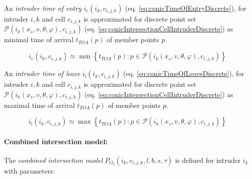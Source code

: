 \noindent An \emph{intruder time of entry} $i_e(i_k,c_{i,j,k})$ (eq. \ref{eq:conicTimeOfEntryDiscrete}), for intruder $i,k$ and cell $c_{i,j,k}$ is approximated for discrete point set  $\mathscr{P}(i_k({x}_s,{v},\theta,\varphi),c_{i,j,k})$ (eq. \ref{eq:conicIntersectionCellIntruderDiscrete}) as minimal time of arrival $t_{TOA}({p})$ of member points ${p}$.

\begin{equation}\label{eq:conicTimeOfEntryDiscrete}
    i_e(i_k,c_{i,j,k})\approx \min \left\{t_{TOA}({p}):{p}\in\mathscr{P}(i_k({x}_s,{v},\theta,\varphi),c_{i,j,k})\right\}
\end{equation}

\noindent An \emph{intruder time of leave} $i_l(i_k,c_{i,j,k})$ (eq. \ref{eq:conicTimeOfLeaveDiscrete}), for intruder $i,k$ and cell $c_{i,j,k}$ is approximated for discrete point set  $\mathscr{P}(i_k({x}_s,{v},\theta,\varphi),c_{i,j,k})$ (eq. \ref{eq:conicIntersectionCellIntruderDiscrete}) as maximal time of arrival $t_{TOA}({p})$ of member points ${p}$.

\begin{equation}\label{eq:conicTimeOfLeaveDiscrete}
    i_l(i_k,c_{i,j,k})\approx \max \left\{t_{TOA}({p}):{p}\in\mathscr{P}(i_k({x}_s,{v},\theta,\varphi),c_{i,j,k})\right\}
\end{equation}

\paragraph{Combined intersection model:} The \emph{combined intersection model} $P_{O_I}(i_k,c_{i,j,k},l,b,s,\tau)$ is defined for intruder $i_k$ with parameters:

